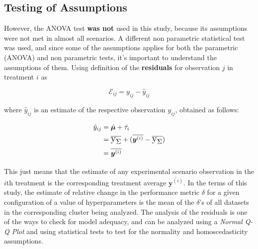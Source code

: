 \subsection{Testing of Assumptions}

However, the ANOVA test \textbf{was not} used in this study, because its assumptions were not met in almost all scenarios. A different non parametric statistical test was used, and since some of the assumptions applies for both the parametric (ANOVA) and non parametric tests, it's important to understand the assumptions of them. Using \cite{montgomery2017design} definition of the \textbf{residuals} for observation $j$ in treatment $i$ as

\begin{equation}
    \mathcal{E}_{ij} = y_{ij} - \hat{y}_{ij}    
    \label{eq:sfm-residuals}
\end{equation}


where $\hat{y}_{ij}$ is an estimate of the respective observation $y_{ij}$, obtained as follows:

\begin{equation}    
    \begin{split}
        \hat{y}_{ij} & = \hat{\bm{\mu}} + \hat{\tau_i}\\
        & = \text{\Large$\overline{\text{\textup{y}}_\Sigma}$} + (\overline{\bm{y}^{(i)}} - \text{\Large$\overline{\text{\textup{y}}_\Sigma}$})\\
        & = \overline{\bm{y}^{(i)}}
    \end{split}
\end{equation}

This just means that the estimate of any experimental scenario observation in the $i$th treatment is the corresponding treatment average $\overline{\bm{y}^{(i)}}$. In the terms of this study, the estimate of relative change in the performance metric $\delta$ for a given configuration of a value of hyperparameters is the mean of the $\delta$'s of all datasets in the corresponding cluster being analyzed. The analysis of the residuals is one of the ways to check for model adequacy, and can be analyzed using a \textit{Normal Q-Q Plot} and using statistical tests to test for the normality and homoscedasticity assumptions.

